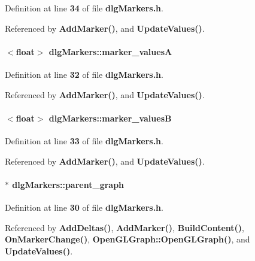 Definition at line {\bf 34} of file {\bf dlg\+Markers.\+h}.



Referenced by {\bf Add\+Marker()}, and {\bf Update\+Values()}.

\paragraph[{marker\+\_\+valuesA}]{$<$float$>$ dlg\+Markers\+::marker\+\_\+valuesA}\label{classdlgMarkers_afba57ec22e29db232b56cae7a577acd1}


Definition at line {\bf 32} of file {\bf dlg\+Markers.\+h}.



Referenced by {\bf Add\+Marker()}, and {\bf Update\+Values()}.

\paragraph[{marker\+\_\+valuesB}]{$<$float$>$ dlg\+Markers\+::marker\+\_\+valuesB}\label{classdlgMarkers_a1dfc0dbac9bac701b76bde71fffa693c}


Definition at line {\bf 33} of file {\bf dlg\+Markers.\+h}.



Referenced by {\bf Add\+Marker()}, and {\bf Update\+Values()}.

\paragraph[{parent\+\_\+graph}]{$\ast$ dlg\+Markers\+::parent\+\_\+graph}\label{classdlgMarkers_abfb07c092afb5c686a19d41f6ebfcacf}


Definition at line {\bf 30} of file {\bf dlg\+Markers.\+h}.



Referenced by {\bf Add\+Deltas()}, {\bf Add\+Marker()}, {\bf Build\+Content()}, {\bf On\+Marker\+Change()}, {\bf Open\+G\+L\+Graph\+::\+Open\+G\+L\+Graph()}, and {\bf Update\+Values()}.

